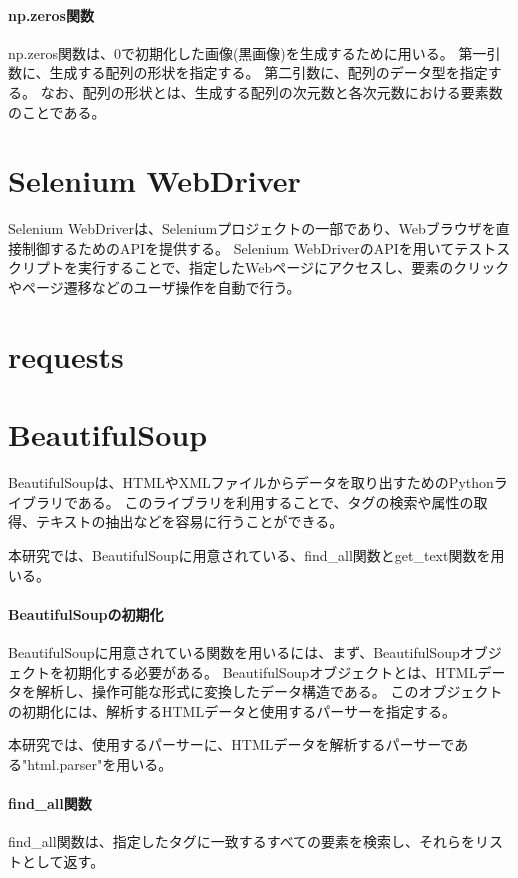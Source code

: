 \paragraph{np.zeros関数}
np.zeros関数\cite{np.zeros}は、$0$で初期化した画像(黒画像)を生成するために用いる。
第一引数に、生成する配列の形状を指定する。
第二引数に、配列のデータ型を指定する。
なお、配列の形状とは、生成する配列の次元数と各次元数における要素数のことである。

\section{Selenium WebDriver}\label{sec:Selenium_WebDriver}
Selenium WebDriver\cite{SeleniumWebDriver}は、Seleniumプロジェクト\cite{Selenium}の一部であり、Webブラウザを直接制御するためのAPIを提供する。
Selenium WebDriverのAPIを用いてテストスクリプトを実行することで、指定したWebページにアクセスし、要素のクリックやページ遷移などのユーザ操作を自動で行う。

\section{requests}\label{sec:requests}

\section{BeautifulSoup}\label{sec:beautifulsoup}
BeautifulSoup\cite{BeautifulSoup}は、HTMLやXMLファイルからデータを取り出すためのPythonライブラリである。
このライブラリを利用することで、タグの検索や属性の取得、テキストの抽出などを容易に行うことができる。
\par
本研究では、BeautifulSoupに用意されている、find\_all関数とget\_text関数を用いる。
\paragraph{BeautifulSoupの初期化}
BeautifulSoupに用意されている関数を用いるには、まず、BeautifulSoupオブジェクトを初期化する必要がある。
BeautifulSoupオブジェクトとは、HTMLデータを解析し、操作可能な形式に変換したデータ構造である。
このオブジェクトの初期化には、解析するHTMLデータと使用するパーサーを指定する。
\par
本研究では、使用するパーサーに、HTMLデータを解析するパーサーである"html.parser"\cite{BeautifulSoup}を用いる。
\paragraph{find\_all関数}
find\_all関数は、指定したタグに一致するすべての要素を検索し、それらをリストとして返す。
